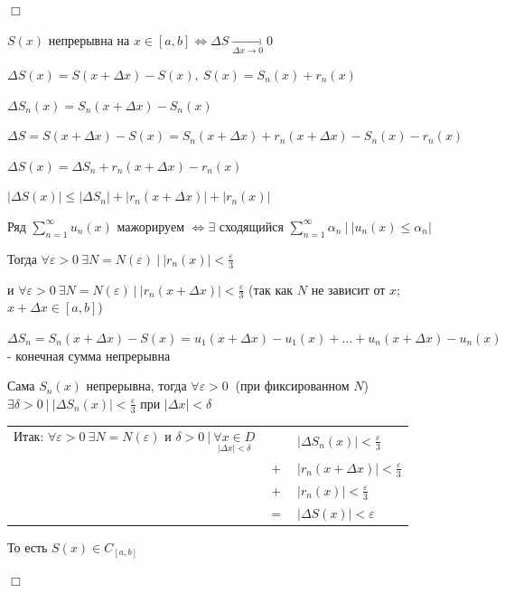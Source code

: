 \documentclass[12pt]{article}
\begin{document}
    \begin{MyProof}
        $\Box$

        $S(x)$ непрерывна на $x \in [a, b] \Longleftrightarrow \Delta S \underset{\Delta x \to 0}{\rightarrow} 0$

        $\Delta S(x) = S(x + \Delta x) - S(x), \ S(x) = S_n(x) + r_n(x)$

        $\Delta S_n(x) = S_n(x + \Delta x) - S_n(x)$

        $\Delta S = S(x + \Delta x) - S(x) = S_n(x + \Delta x) + r_n(x +  \Delta x) - S_n(x) - r_n(x)$

        $\Delta S(x) = \Delta S_n + r_n(x + \Delta x) - r_n(x)$

        $|\Delta S(x)| \leq |\Delta S_n| + |r_n(x + \Delta x)| + |r_n(x)|$

        Ряд $\sum_{n = 1}^\infty u_n(x)$ мажорируем $\Longleftrightarrow \exists$ сходящийся $\sum_{n = 1}^\infty \alpha_n \ \Big| \ |u_n(x) \leq \alpha_n|$
    
        Тогда $\forall \varepsilon > 0 \ \exists N = N(\varepsilon) \ | \ |r_n(x)| < \frac{\varepsilon}{3}$

        и $\forall \varepsilon > 0 \ \exists N = N(\varepsilon) \ | \ |r_n(x + \Delta x)| < \frac{\varepsilon}{3}$ (так как $N$ не зависит от $x$; $x + \Delta x \in [a, b]$) 
    
        $\Delta S_n = S_n(x + \Delta x) - S(x) = u_1(x + \Delta x) - u_1(x) + \dots + u_n(x + \Delta x) - u_n(x)$ - конечная сумма непрерывна

        Сама $S_n(x)$ непрерывна, тогда $\forall \varepsilon > 0 \ $ (при фиксированном $N$) $\exists \delta > 0 \ | \ |\Delta S_n(x)| < \frac{\varepsilon}{3}$ при $|\Delta x| < \delta$

        \bgroup
        \setlength\tabcolsep{1.5pt}
        \begin{tabular}{ccl}
            Итак: $\forall \varepsilon > 0 \ \exists N = N(\varepsilon)$ и $\delta > 0 \ | \ \underset{|\Delta x| < \delta}{\forall x \in D}$ & & $|\Delta S_n(x)| < \frac{\varepsilon}{3}$ \\
            
            & $+$ & $|r_n(x + \Delta x)| < \frac{\varepsilon}{3}$ \\ 
            
            & $+$ & $|r_n(x)| < \frac{\varepsilon}{3}$ \\

            & $=$ & $|\Delta S(x)| < \varepsilon$
        \end{tabular}
        \egroup

        То есть $S(x) \in C_{[a, b]}$

        $\Box$
    \end{MyProof}
\end{document}
